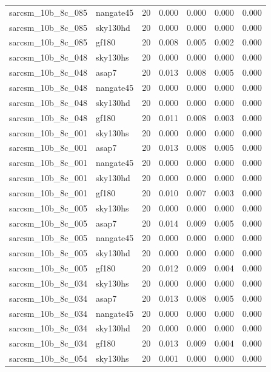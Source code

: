 \begin{tabular}{llrrrrr}
sarcsm\_10b\_8c\_085 & nangate45 & 20 & 0.000 & 0.000 & 0.000 & 0.000 \\
sarcsm\_10b\_8c\_085 & sky130hd & 20 & 0.000 & 0.000 & 0.000 & 0.000 \\
sarcsm\_10b\_8c\_085 & gf180 & 20 & 0.008 & 0.005 & 0.002 & 0.000 \\
sarcsm\_10b\_8c\_048 & sky130hs & 20 & 0.000 & 0.000 & 0.000 & 0.000 \\
sarcsm\_10b\_8c\_048 & asap7 & 20 & 0.013 & 0.008 & 0.005 & 0.000 \\
sarcsm\_10b\_8c\_048 & nangate45 & 20 & 0.000 & 0.000 & 0.000 & 0.000 \\
sarcsm\_10b\_8c\_048 & sky130hd & 20 & 0.000 & 0.000 & 0.000 & 0.000 \\
sarcsm\_10b\_8c\_048 & gf180 & 20 & 0.011 & 0.008 & 0.003 & 0.000 \\
sarcsm\_10b\_8c\_001 & sky130hs & 20 & 0.000 & 0.000 & 0.000 & 0.000 \\
sarcsm\_10b\_8c\_001 & asap7 & 20 & 0.013 & 0.008 & 0.005 & 0.000 \\
sarcsm\_10b\_8c\_001 & nangate45 & 20 & 0.000 & 0.000 & 0.000 & 0.000 \\
sarcsm\_10b\_8c\_001 & sky130hd & 20 & 0.000 & 0.000 & 0.000 & 0.000 \\
sarcsm\_10b\_8c\_001 & gf180 & 20 & 0.010 & 0.007 & 0.003 & 0.000 \\
sarcsm\_10b\_8c\_005 & sky130hs & 20 & 0.000 & 0.000 & 0.000 & 0.000 \\
sarcsm\_10b\_8c\_005 & asap7 & 20 & 0.014 & 0.009 & 0.005 & 0.000 \\
sarcsm\_10b\_8c\_005 & nangate45 & 20 & 0.000 & 0.000 & 0.000 & 0.000 \\
sarcsm\_10b\_8c\_005 & sky130hd & 20 & 0.000 & 0.000 & 0.000 & 0.000 \\
sarcsm\_10b\_8c\_005 & gf180 & 20 & 0.012 & 0.009 & 0.004 & 0.000 \\
sarcsm\_10b\_8c\_034 & sky130hs & 20 & 0.000 & 0.000 & 0.000 & 0.000 \\
sarcsm\_10b\_8c\_034 & asap7 & 20 & 0.013 & 0.008 & 0.005 & 0.000 \\
sarcsm\_10b\_8c\_034 & nangate45 & 20 & 0.000 & 0.000 & 0.000 & 0.000 \\
sarcsm\_10b\_8c\_034 & sky130hd & 20 & 0.000 & 0.000 & 0.000 & 0.000 \\
sarcsm\_10b\_8c\_034 & gf180 & 20 & 0.013 & 0.009 & 0.004 & 0.000 \\
sarcsm\_10b\_8c\_054 & sky130hs & 20 & 0.001 & 0.000 & 0.000 & 0.000 \\

\end{tabular}
